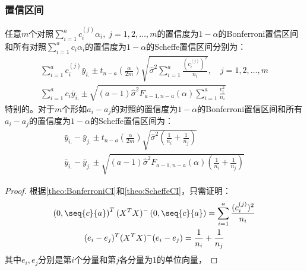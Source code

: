 \subsubsection{置信区间}
\begin{theorem}
	任意$m$个对照$\sum\limits_{i=1}^{a}c_i^{(j)}\alpha_i,\;j=1,2,\dots,m$的置信度为$1-\alpha$的Bonferroni置信区间和所有对照$\sum\limits_{i=1}^{a}c_i\alpha_i$的置信度为$1-\alpha$的Scheffe置信区间分别为：
	\begin{gather*}
		\sum_{i=1}^{a}c_i^{(j)}\bar{y}_{i.}\pm t_{n-a}\left(\frac{\alpha}{2m}\right)\sqrt{\hat{\sigma}^2\sum_{i=1}^{a}\frac{(c_i^{(j)})^2}{n_i}},\quad j=1,2,\dots,m \\
		\sum_{i=1}^{a}c_i\bar{y}_{i.}\pm\sqrt{(a-1)\hat{\sigma}^2F_{a-1,n-a}(\alpha)\sum_{i=1}^{a}\frac{c_i^2}{n_i}}
	\end{gather*}
	特别的。对于$m$个形如$a_i-a_j$的对照的置信度为$1-\alpha$的Bonferroni置信区间和所有$a_i-a_j$的置信度为$1-\alpha$的Scheffe置信区间为：
	\begin{gather*}
		\bar{y}_{i.}-\bar{y}_{j.}\pm t_{n-a}\left(\frac{\alpha}{2m}\right)\sqrt{\hat{\sigma}^2\left(\frac{1}{n_i}+\frac{1}{n_j}\right)} \\
		\bar{y}_{i.}-\bar{y}_{j.}\pm\sqrt{(a-1)\hat{\sigma}^2F_{a-1,n-a}(\alpha)\left(\frac{1}{n_i}+\frac{1}{n_j}\right)}
	\end{gather*}
\end{theorem}
\begin{proof}
	根据\cref{theo:BonferroniCI}和\cref{theo:ScheffeCI}，只需证明：
	\begin{gather*}
		\left(0,\seq{c}{a}\right)^T(X^TX)^-\left(0,\seq{c}{a}\right)=\sum_{i=1}^{a}\frac{(c_i^{(j)})^2}{n_i} \\
		(e_i-e_j)^T(X^TX)^-(e_i-e_j)=\frac{1}{n_i}+\frac{1}{n_j}
	\end{gather*}
	其中$e_i,e_j$分别是第$i$个分量和第$j$各分量为$1$的单位向量，
\end{proof}

